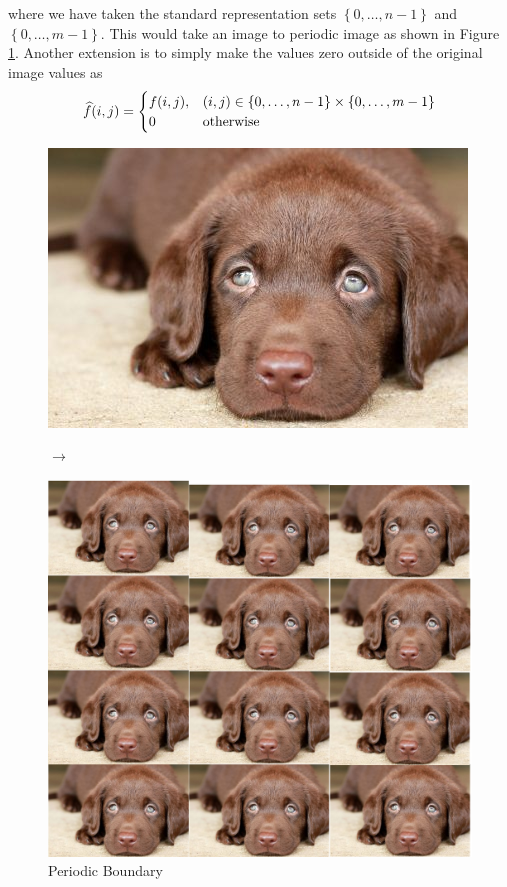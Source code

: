 \documentclass[12pt,letterpaper]{article}
\renewcommand{\hat}{\widehat}
\begin{document}
where we have taken the standard representation sets $\left\{ 0, \ldots, n-1 \right\}$ and $\left\{ 0, \ldots, m-1 \right\}$.
This would take an image to periodic image as shown in Figure \ref{fig:periodic}.
Another extension is to simply make the values zero outside of the original image values as
\begin{equation*}
    \hat f(i,j) = 
    \begin{cases}
        f(i,j), & (i,j) \in \left\{ 0,\ldots,n-1 \right\}\times\left\{ 0,\ldots,m-1 \right\} \\
        0 & \textup{otherwise}
    \end{cases}
\end{equation*}
\begin{figure}[htpb]
    \centering
    \begin{minipage}[c]{.4\textwidth}
        \includegraphics[width=\textwidth]{images/lab}
    \end{minipage}
    \qquad $\longrightarrow$ \qquad
    \begin{minipage}[c]{.4\textwidth}
        \includegraphics[width=\textwidth]{images/lab2}
    \end{minipage}
    \caption{Periodic Boundary}
    \label{fig:periodic}
\end{figure}




\cite{babyrudin}




\end{document}
